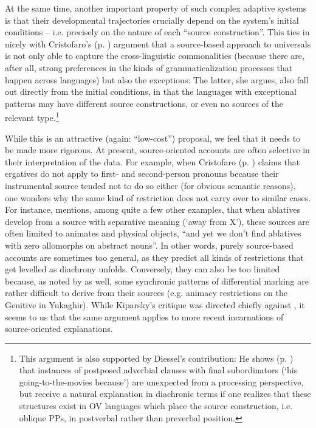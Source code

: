 \documentclass[output=paper]{langsci/langscibook}
\begin{document}
At the same time, another important property of such complex adaptive systems is that their developmental trajectories crucially depend on the system’s initial conditions – i.e. precisely on the nature of each “source construction”. This ties in nicely with Cristofaro’s (p. \pageref{p:cristofaro:commonalitiesexceptions}) argument that a source-based approach to universals is not only able to capture the cross-linguistic commonalities (because there are, after all, strong preferences in the kinds of grammaticalization processes that happen across languages) but also the exceptions: The latter, she argues, also fall out directly from the initial conditions, in that the languages with exceptional patterns may have different source constructions, or even no sources of the relevant type.\footnote{This argument is also supported by Diessel’s contribution: He shows (p. \pageref{p:diessel:exception}) that instances of postposed adverbial clauses with final subordinators (‘his going-to-the-movies because’) are unexpected from a processing perspective, but receive a natural explanation in diachronic terms if one realizes that these structures exist in OV languages which place the source construction, i.e. oblique PPs, in postverbal rather than preverbal position.}  

While this is an attractive (again: “low-cost”) proposal, we feel that it needs to be made more rigorous. At present, source-oriented accounts are often selective in their interpretation of the data. For example, when Cristofaro (p. \pageref{p:cristofaro:ergatives}) claims that ergatives do not apply to first- and second-person pronouns because their instrumental source tended not to do so either (for obvious semantic reasons), one wonders why the same kind of restriction does not carry over to similar cases. For instance, \citet[36]{Kiparsky2008} mentions, among quite a few other examples, that when ablatives develop from a source with separative meaning (‘away from X’), these sources are often limited to animates and physical objects, “and yet we don't find ablatives with zero allomorphs on abstract nouns”. In other words, purely source-based accounts are sometimes too general, as they predict all kinds of restrictions that get levelled as diachrony unfolds. Conversely, they can also be too limited because, as noted by \citet{Kiparsky2008} as well, some synchronic patterns of differential marking are rather difficult to derive from their sources (e.g. animacy restrictions on the Genitive in Yukaghir). While Kiparsky’s critique was directed chiefly against \citet{Garrett1990}, it seems to us that the same argument applies to more recent incarnations of source-oriented explanations.
\end{document}
